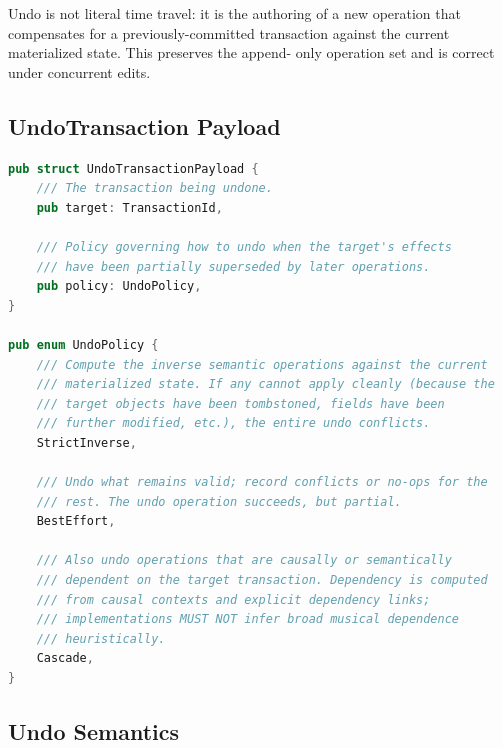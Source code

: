 \documentclass[11pt,letterpaper]{report}
\begin{document}
Undo is not literal time travel: it is the authoring of a new
operation that compensates for a previously-committed transaction
against the current materialized state. This preserves the append-
only operation set and is correct under concurrent edits.

\subsection{UndoTransaction Payload}

\begin{lstlisting}[language=Rust]
pub struct UndoTransactionPayload {
    /// The transaction being undone.
    pub target: TransactionId,

    /// Policy governing how to undo when the target's effects
    /// have been partially superseded by later operations.
    pub policy: UndoPolicy,
}

pub enum UndoPolicy {
    /// Compute the inverse semantic operations against the current
    /// materialized state. If any cannot apply cleanly (because the
    /// target objects have been tombstoned, fields have been
    /// further modified, etc.), the entire undo conflicts.
    StrictInverse,

    /// Undo what remains valid; record conflicts or no-ops for the
    /// rest. The undo operation succeeds, but partial.
    BestEffort,

    /// Also undo operations that are causally or semantically
    /// dependent on the target transaction. Dependency is computed
    /// from causal contexts and explicit dependency links;
    /// implementations MUST NOT infer broad musical dependence
    /// heuristically.
    Cascade,
}
\end{lstlisting}

\subsection{Undo Semantics}
\end{document}
